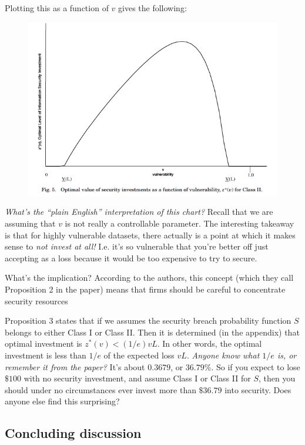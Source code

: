 \documentclass[11pt]{article}
\begin{document}
Plotting this as a function of $v$ gives the following:
\begin{figure}[h]
    \centering
    \includegraphics*[width=4.5in]{fig5.png}
    \label{fig:fig5}
\end{figure}
\FloatBarrier

{\it What's the ``plain English'' interpretation of this chart?} Recall that we are assuming that $v$ is not really a controllable parameter. The interesting takeaway is that for highly vulnerable datasets, there actually is a point at which it makes sense to {\it not invest at all!} I.e. it's so vulnerable that you're better off just accepting as a loss because it would be too expensive to try to secure. 

What's the implication? According to the authors, this concept (which they call Proposition 2 in the paper) means that firms should be careful to concentrate security resources

Proposition 3 states that if we assumes the security breach probability function $S$ belongs to either Class I or Class II. Then it is determined (in the appendix) that optimal investment is $z^*(v) < (1/e) v L$. In other words, the optimal investment is less than $1/e$ of the expected loss $vL$. {\it Anyone know what $1/e$ is, or remember it from the paper?} It's about $0.3679$, or $36.79\%$. So if you expect to lose $\$100$ with no security investment, and assume Class I or Class II for $S$, then you should under no circumstances ever invest more than $\$36.79$ into security. Does anyone else find this surprising?

\subsection{Concluding discussion}
\end{document}
